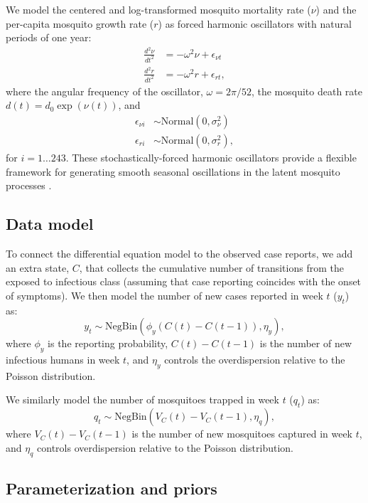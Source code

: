 \documentclass[10pt,letterpaper]{article}
\begin{document}
We model the centered and log-transformed mosquito mortality rate ($\nu$) and the per-capita mosquito growth rate ($r$) as forced harmonic oscillators with natural periods of one year:
\begin{align}
\frac{d^2\nu}{dt^2} &= -\omega^2 \nu + \epsilon_{\nu t}\\
\frac{d^2 r}{dt^2} &= -\omega^2 r + \epsilon_{rt},
\end{align}
where the angular frequency of the oscillator, $\omega = 2\pi / 52$, the mosquito death rate $d(t) = d_0 \exp(\nu(t))$, and
\begin{align}
\epsilon_{\nu i} & \sim \text{Normal}(0, \sigma^2_{\nu})\\
\epsilon_{ri} & \sim \text{Normal}(0, \sigma^2_r),
\end{align}
for $i = 1 \dots 243$.
These stochastically-forced harmonic oscillators provide a flexible framework for generating smooth seasonal oscillations in the latent mosquito processes \cite{Ramsay2017}.

\subsection*{Data model}

To connect the differential equation model to the observed case reports, we add an extra state, $C$, that collects the cumulative number of transitions from the exposed to infectious class (assuming that case reporting coincides with the onset of symptoms).
We then model the number of new cases reported in week $t$ ($y_t$) as:
\begin{equation}
y_t  \sim \text{NegBin}(\phi_y (C(t) - C(t-1)), \eta_y),
\end{equation}
where $\phi_y$ is the reporting probability, $C(t) - C(t-1)$ is the number of new infectious humans in week $t$, and $\eta_y$ controls the overdispersion relative to the Poisson distribution.

We similarly model the number of mosquitoes trapped in week $t$ ($q_t$) as:
\begin{equation}
q_t \sim \text{NegBin}(V_{C}(t) - V_{C}(t-1), \eta_q),
\end{equation}
where $V_{C}(t) - V_{C}(t-1)$ is the number of new mosquitoes captured in week $t$, and $\eta_q$ controls overdispersion relative to the Poisson distribution.

\subsection*{Parameterization and priors}
\end{document}
